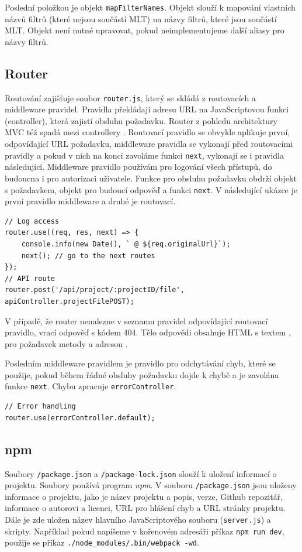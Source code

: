Poslední položkou je objekt \texttt{mapFilterNames}. Objekt slouží k mapování vlastních názvů filtrů (které nejsou součástí MLT) na názvy filtrů, které jsou součástí MLT. Objekt není nutné upravovat, pokud neimplementujeme další aliasy pro názvy filtrů.

\subsection{Router}
Routování zajišťuje soubor \texttt{router.js}, který se skládá z routovacích a middleware pravidel. Pravidla překládají adresu URL na JavaScriptovou funkci (controller), která zajistí obsluhu požadavku. Router z pohledu architektury MVC též spadá mezi controllery . Routovací pravidlo se obvykle aplikuje první, odpovídající URL požadavku, middleware pravidla se vykonají před routovacími pravidly a pokud v nich na konci zavoláme funkci \texttt{next}, vykonají se i pravidla následující. Middleware pravidlo používám pro logování všech přístupů, do budoucna i pro autorizaci uživatele. Funkce pro obsluhu požadavku obdrží objekt s požadavkem, objekt pro budoucí odpověď a funkci \texttt{next}. V následující ukázce je první pravidlo middleware a druhé je routovací.
\begin{lstlisting}[style=JavaScript]
// Log access
router.use((req, res, next) => {
    console.info(new Date(), ` @ ${req.originalUrl}`);
    next(); // go to the next routes
});
// API route
router.post('/api/project/:projectID/file', apiController.projectFilePOST);
\end{lstlisting}

V případě, že router nenalezne v seznamu pravidel odpovídající routovací pravidlo, vrací odpověď s kódem 404. Tělo odpovědi obsahuje HTML s textem , pro požadavek metody  a adresou .

Posledním middleware pravidlem je pravidlo pro odchytávání chyb, které  se použije, pokud během řádné obsluhy požadavku dojde k chybě a je zavolána funkce \texttt{next}. Chybu zpracuje \texttt{errorController}.
\begin{lstlisting}[style=JavaScript]
// Error handling
router.use(errorController.default);
\end{lstlisting}

\subsection{npm}
Soubory \texttt{/package.json} a \texttt{/package-lock.json} slouží k uložení informací o projektu. Soubory používá program \textit{npm}. V souboru \texttt{/package.json} jsou uloženy informace o projektu, jako je název projektu a popis, verze, Github repozitář, informace o autorovi a licenci, URL pro hlášení chyb a URL stránky projektu. Dále je zde uložen název hlavního JavaScriptového souboru (\texttt{server.js}) a skripty. Například pokud napíšeme v kořenovém adresáři příkaz \texttt{npm run dev}, použije se příkaz \texttt{./node\_modules/.bin/webpack -wd}.

